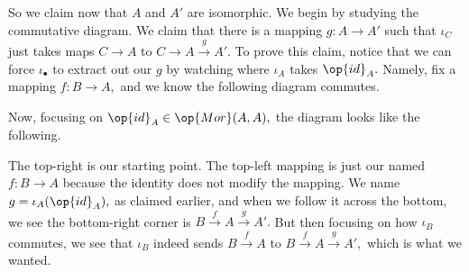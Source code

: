 So we claim now that $A$ and $A'$ are isomorphic. We begin by studying the commutative diagram. We claim that there is a mapping $g:A\to A'$ such that $\iota_C$ just takes maps $C\to A$ to $C\to A\stackrel g\to A'.$ To prove this claim, notice that we can force $\iota_\bullet$ to extract out our $g$ by watching where $\iota_A$ takes $\op{id}_A.$ Namely, fix a mapping $f:B\to A,$ and we know the following diagram commutes.
\begin{center}
\end{center}
Now, focusing on $\op{id}_A\in\op{Mor}(A,A),$ the diagram looks like the following.
\begin{center}
\end{center}
The top-right is our starting point. The top-left mapping is just our named $f:B\to A$ because the identity does not modify the mapping. We name $g=\iota_A(\op{id}_A),$ as claimed earlier, and when we follow it across the bottom, we see the bottom-right corner is $B\stackrel f\to A\stackrel g\to A'.$ But then focusing on how $\iota_B$ commutes, we see that $\iota_B$ indeed sends $B\stackrel f\to A$ to $B\stackrel f\to A\stackrel g\to A',$ which is what we wanted.

